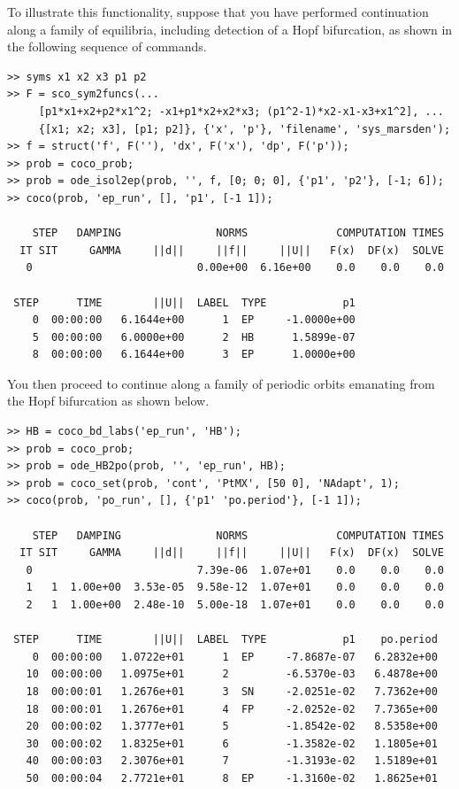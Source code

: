 To illustrate this functionality, suppose that you have performed continuation along a family of equilibria, including detection of a Hopf bifurcation, as shown in the following sequence of commands.
\begin{lstlisting}[language=coco-highlight,frame=lines]
>> syms x1 x2 x3 p1 p2
>> F = sco_sym2funcs(...
     [p1*x1+x2+p2*x1^2; -x1+p1*x2+x2*x3; (p1^2-1)*x2-x1-x3+x1^2], ...
     {[x1; x2; x3], [p1; p2]}, {'x', 'p'}, 'filename', 'sys_marsden');
>> f = struct('f', F(''), 'dx', F('x'), 'dp', F('p'));
>> prob = coco_prob;
>> prob = ode_isol2ep(prob, '', f, [0; 0; 0], {'p1', 'p2'}, [-1; 6]);
>> coco(prob, 'ep_run', [], 'p1', [-1 1]);

    STEP   DAMPING               NORMS              COMPUTATION TIMES
  IT SIT     GAMMA     ||d||     ||f||     ||U||   F(x)  DF(x)  SOLVE
   0                          0.00e+00  6.16e+00    0.0    0.0    0.0

 STEP      TIME        ||U||  LABEL  TYPE            p1
    0  00:00:00   6.1644e+00      1  EP     -1.0000e+00
    5  00:00:00   6.0000e+00      2  HB      1.5899e-07
    8  00:00:00   6.1644e+00      3  EP      1.0000e+00
\end{lstlisting}
You then proceed to continue along a family of periodic orbits emanating from the Hopf bifurcation as shown below.
\begin{lstlisting}[language=coco-highlight,frame=lines]
>> HB = coco_bd_labs('ep_run', 'HB');
>> prob = coco_prob;
>> prob = ode_HB2po(prob, '', 'ep_run', HB);
>> prob = coco_set(prob, 'cont', 'PtMX', [50 0], 'NAdapt', 1);
>> coco(prob, 'po_run', [], {'p1' 'po.period'}, [-1 1]);

    STEP   DAMPING               NORMS              COMPUTATION TIMES
  IT SIT     GAMMA     ||d||     ||f||     ||U||   F(x)  DF(x)  SOLVE
   0                          7.39e-06  1.07e+01    0.0    0.0    0.0
   1   1  1.00e+00  3.53e-05  9.58e-12  1.07e+01    0.0    0.0    0.0
   2   1  1.00e+00  2.48e-10  5.00e-18  1.07e+01    0.0    0.0    0.0

 STEP      TIME        ||U||  LABEL  TYPE            p1    po.period
    0  00:00:00   1.0722e+01      1  EP     -7.8687e-07   6.2832e+00
   10  00:00:00   1.0975e+01      2         -6.5370e-03   6.4878e+00
   18  00:00:01   1.2676e+01      3  SN     -2.0251e-02   7.7362e+00
   18  00:00:01   1.2676e+01      4  FP     -2.0252e-02   7.7365e+00
   20  00:00:02   1.3777e+01      5         -1.8542e-02   8.5358e+00
   30  00:00:02   1.8325e+01      6         -1.3582e-02   1.1805e+01
   40  00:00:03   2.3076e+01      7         -1.3193e-02   1.5189e+01
   50  00:00:04   2.7721e+01      8  EP     -1.3160e-02   1.8625e+01
\end{lstlisting}

